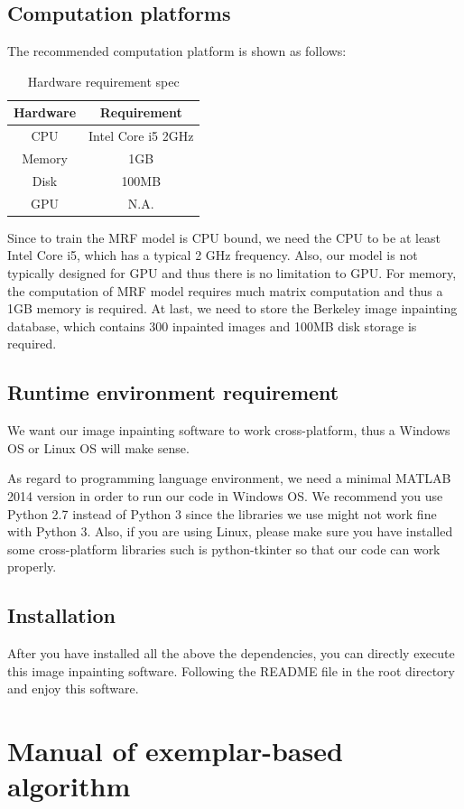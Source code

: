 \subsection{Computation platforms}
The recommended computation platform is shown as follows:
\begin{table}[H]
\centering
\begin{tabular}{|c|c|}
\hline
Hardware & Requirement \\ \hline
CPU & Intel Core i5 2GHz \\ \hline
Memory & 1GB \\ \hline
Disk & 100MB \\ \hline
GPU & N.A. \\ \hline
\end{tabular}
\caption{Hardware requirement spec}
\end{table}
Since to train the MRF model is CPU bound, we need the CPU to be at least Intel Core i5, which has a typical 2 GHz frequency. Also, our model is not typically designed for GPU and thus there is no limitation to GPU. For memory, the computation of MRF model requires much matrix computation and thus a 1GB memory is required. At last, we need to store the Berkeley image inpainting database, which contains 300 inpainted images and 100MB disk storage is required.
\subsection{Runtime environment requirement}
We want our image inpainting software to work cross-platform, thus a Windows OS or Linux OS will make sense.

As regard to programming language environment, we need a minimal MATLAB 2014 version in order to run our code in Windows OS. We recommend you use Python 2.7 instead of Python 3 since the libraries we use might not work fine with Python 3. Also, if you are using Linux, please make sure you have installed some cross-platform libraries such is python-tkinter so that our code can work
properly.
\subsection{Installation}
After you have installed all the above the dependencies, you can directly execute this image inpainting software. Following the README file in the root directory and enjoy this software.




\newpage

\section{Manual of exemplar-based algorithm}

